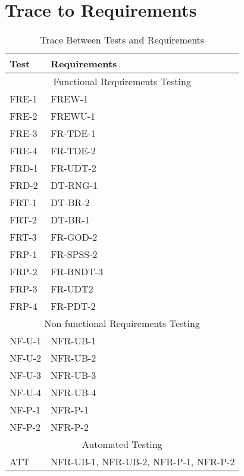 \documentclass[12,english]{article}
\begin{document}
\section{Trace to Requirements}
\begin{table}[!htbp]
			\begin{tabular}{ll}
				\toprule
				Test & Requirements \\
				\midrule
				\multicolumn{2}{c}{Functional Requirements Testing} \\
				\midrule
				FRE-1 & FREW-1 \\
				FRE-2 & FREWU-1 \\
				FRE-3 & FR-TDE-1 \\
				FRE-4 & FR-TDE-2 \\
				FRD-1 & FR-UDT-2 \\
				FRD-2 & DT-RNG-1 \\
				FRT-1 & DT-BR-2 \\
				FRT-2 & DT-BR-1 \\
				FRT-3 & FR-GOD-2 \\
				FRP-1 & FR-SPSS-2 \\
				FRP-2 & FR-BNDT-3 \\
				FRP-3 & FR-UDT2 \\
				FRP-4 & FR-PDT-2 \\
				\midrule
				\multicolumn{2}{c}{Non-functional Requirements Testing} \\
				\midrule
				NF-U-1 & NFR-UB-1 \\
				NF-U-2 & NFR-UB-2 \\
				NF-U-3 & NFR-UB-3 \\
				NF-U-4 & NFR-UB-4 \\
				NF-P-1 & NFR-P-1 \\
				NF-P-2 & NFR-P-2 \\
				
				\midrule
				\multicolumn{2}{c}{Automated Testing} \\
				\midrule
				ATT & NFR-UB-1, NFR-UB-2, NFR-P-1, NFR-P-2\\
				
				\bottomrule
			\end{tabular}
			\caption{Trace Between Tests and Requirements}
			\makeatletter
			\def\rulecolor#1#{\CT@arc{#1}}
			\def\CT@arc#1#2{%
				\ifdim\baselineskip=\z@\noalign\fi
				{\gdef\CT@arc@{\color#1{#2}}}}
			\let\CT@arc@\relax
			\makeatother
			\label{Table}
		\end{table}
		
\end{document}
